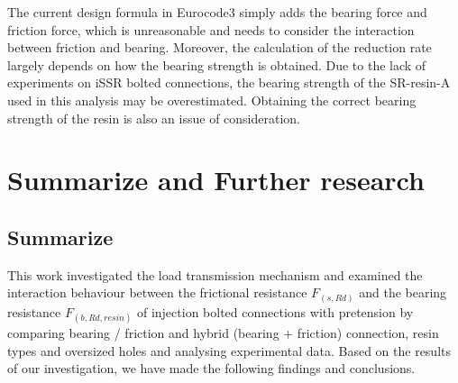 The current design formula in Eurocode3 simply adds the bearing force and friction force, which is unreasonable and needs to consider the interaction between friction and bearing. Moreover, the calculation of the reduction rate largely depends on how the bearing strength is obtained. Due to the lack of experiments on iSSR bolted connections, the bearing strength of the SR-resin-A used in this analysis may be overestimated. Obtaining the correct bearing strength of the resin is also an issue of consideration.

\section{Summarize and Further research}

\subsection{Summarize}

This work investigated the load transmission mechanism and examined the interaction behaviour between the frictional resistance $F_{(s,Rd)}$ and the bearing resistance $F_{(b,Rd,resin)}$ of injection bolted connections with pretension by comparing bearing / friction and hybrid (bearing + friction) connection, resin types and oversized holes and analysing experimental data. Based on the results of our investigation, we have made the following findings and conclusions.

